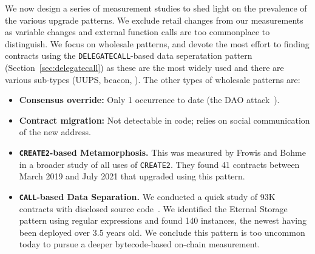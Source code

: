 We now design a series of measurement studies to shed light on the prevalence of the various upgrade patterns. We exclude retail changes from our measurements as variable changes and external function calls are too commonplace to distinguish. We focus on wholesale patterns, and devote the most effort to finding contracts using the \texttt{DELEGATECALL}-based data seperatation pattern (Section~\ref{sec:delegatecall}) as these are the most widely used and there are various sub-types (UUPS, beacon, \etc). The other types of wholesale patterns are: 
\begin{itemize}
\item \textbf{Consensus override:} Only 1 occurrence to date (the DAO attack~\cite{dhillon2017dao}).
\item \textbf{Contract migration:} Not detectable in code; relies on social communication of the new address.
\item \textbf{\texttt{CREATE2}-based Metamorphosis.} This was measured by Frowis and Bohme~\cite{frowisnot} in a broader study of all uses of \texttt{CREATE2}. They found 41 contracts between March 2019 and July 2021 that upgraded using this pattern.
\item \textbf{\texttt{CALL}-based Data Separation.} We conducted a quick study of 93K contracts with disclosed source code~\cite{smart_contract_sanctuary}. We identified the Eternal Storage pattern using regular expressions and found 140 instances, the newest having been deployed over 3.5 years old. We conclude this pattern is too uncommon today to pursue a deeper bytecode-based on-chain measurement.  
\end{itemize}





